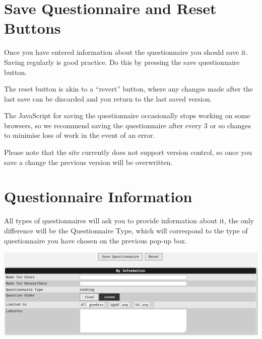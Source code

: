 \documentclass[]{book}
\begin{document}
\section{Save Questionnaire and Reset
Buttons}\label{save-questionnaire-and-reset-buttons}

Once you have entered information about the questionnaire you should
save it. Saving regularly is good practice. Do this by pressing the save
questionnaire button.

The reset button is akin to a ``revert'' button, where any changes made
after the last save can be discarded and you return to the last saved
version.

\begin{danger}
The JavaScript for saving the questionnaire occasionally stops working
on some browsers, so we recommend saving the questionnaire after every 3
or so changes to minimise loss of work in the event of an error.

Please note that the site currently does not support version control, so
once you save a change the previous version will be overwritten.
\end{danger}

\section{Questionnaire Information}\label{questionnaire-information}

All types of questionnaires will ask you to provide information about
it, the only difference will be the Questionnaire Type, which will
correspond to the type of questionnaire you have chosen on the previous
pop-up box.

\includegraphics{images/screenshots/quest_info.png}
\end{document}
